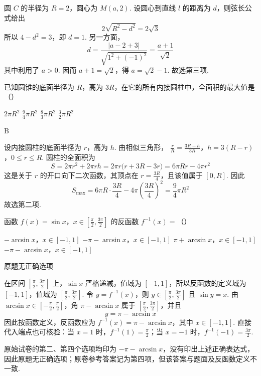 \begin{solution}
圆 \(C\) 的半径为 \(R=2\)，圆心为 \(M(a,2)\). 设圆心到直线 \(l\) 的距离为 \(d\)，则弦长公式给出
\[
2\sqrt{R^2-d^2}=2\sqrt3
\]
所以 \(4-d^2=3\)，即 \(d=1\). 另一方面，
\[
d=\frac{|a-2+3|}{\sqrt{1^2+(-1)^2}}=\frac{a+1}{\sqrt2}
\]
其中利用了 \(a>0\). 因而 \(a+1=\sqrt2\)，得 \(a=\sqrt2-1\). 故选第三项.
\end{solution}

\begin{problem}
已知圆锥的底面半径为 \(R\)，高为 \(3R\)，在它的所有内接圆柱中，全面积的最大值是（\quad）

\choices
    {\(2\pi R^2\)}
    {\(\frac{9}{4}\pi R^2\)}
    {\(\frac{8}{3}\pi R^2\)}
    {\(\frac{3}{2}\pi R^2\)}
\end{problem}

\begin{answer}
B
\end{answer}

\begin{solution}
设内接圆柱的底面半径为 \(r\)，高为 \(h\). 由相似三角形，
\(\frac rR=\frac{3R-h}{3R}\)，\(h=3(R-r)\)，\(0\leqslant r\leqslant R\).
圆柱的全面积为
\[
S=2\pi r^2+2\pi rh=2\pi r\bigl(r+3R-3r\bigr)=6\pi Rr-4\pi r^2
\]
这是关于 \(r\) 的开口向下二次函数，其顶点在 \(r=\frac{3R}{4}\)，且该值属于 \([0,R]\). 因此
\[
S_{\max}=6\pi R\cdot\frac{3R}{4}-4\pi\left(\frac{3R}{4}\right)^2=\frac94\pi R^2
\]
故选第二项.
\end{solution}

\begin{problem}
函数 \(f(x) = \sin x\)，\(x \in \left[\frac{\pi}{2}, \frac{3\pi}{2}\right]\) 的反函数 \(f^{-1}(x) =\)（\quad）

\choices
    {\(-\arcsin x\)，\(x \in [-1,1]\)}
    {\(-\pi - \arcsin x\)，\(x \in [-1,1]\)}
    {\(\pi + \arcsin x\)，\(x \in [-1,1]\)}
    {\(-\pi - \arcsin x\)，\(x \in [-1,1]\)}
\end{problem}

\begin{answer}
原题无正确选项
\end{answer}

\begin{solution}
在区间 \(\left[\frac\pi2,\frac{3\pi}2\right]\) 上，\(\sin x\) 严格递减，值域为 \([-1,1]\)，所以反函数的定义域为 \([-1,1]\)，值域为 \(\left[\frac\pi2,\frac{3\pi}2\right]\). 令 \(y=f^{-1}(x)\)，则 \(y\in\left[\frac\pi2,\frac{3\pi}2\right]\) 且 \(\sin y=x\). 由 \(\arcsin x\in\left[-\frac\pi2,\frac\pi2\right]\)，角 \(\pi-\arcsin x\) 属于 \(\left[\frac\pi2,\frac{3\pi}2\right]\)，并且
\[
y=\pi-\arcsin x
\]
因此按函数定义，反函数应为 \(f^{-1}(x)=\pi-\arcsin x\)，其中 \(x\in[-1,1]\). 直接代入端点也可核验：当 \(x=1\) 时，\(f^{-1}(1)=\frac\pi2\)；当 \(x=-1\) 时，\(f^{-1}(-1)=\frac{3\pi}2\).

原始试卷的第二、第四个选项均印为 \(-\pi-\arcsin x\)，没有印出上述正确表达式，因此原题无正确选项；原卷参考答案记为第四项，但该答案与题面及反函数定义不一致.
\end{solution}


